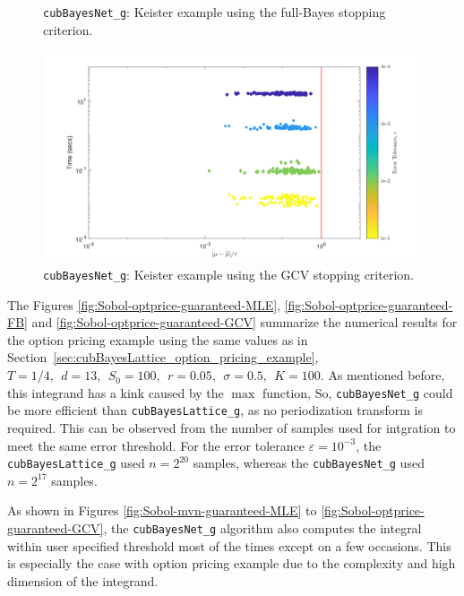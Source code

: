\documentclass{iitthesis}          %
\newcommand{\code}[1]{\texttt{#1}}
\newcommand\secref{Section~\ref}
\begin{document}
{{{{{{\begin{figure}
	\caption[Sobol: Keister guaranteed:Full Bayes]{\code{cubBayesNet\_g}: Keister example using the full-Bayes stopping criterion.}
	\label{fig:Sobol-keister-guaranteed-FB}
\end{figure}
\begin{figure}
	\centering
	\includegraphics[width=0.95\linewidth]{"Sobol_Keister_guaranteed_time_GCV__d4_r1_2019-Jun-9"}
	\caption[Sobol: Keister guaranteed:GCV]{\code{cubBayesNet\_g}: Keister example using the GCV stopping criterion.}
	\label{fig:Sobol-keister-guaranteed-GCV}
\end{figure}

The Figures \ref{fig:Sobol-optprice-guaranteed-MLE}, \ref{fig:Sobol-optprice-guaranteed-FB} and 
\ref{fig:Sobol-optprice-guaranteed-GCV} summarize the numerical results for the option pricing example using the same values as in \secref{sec:cubBayesLattice_option_pricing_example},
$
T = 1/4, \ \ d = 13, \ \ S_0 = 100, \ \ r =  0.05, \ \ \sigma = 0.5, \ \ K = 100.
$
As mentioned before, this integrand has a kink caused by the $\max$ function, So, \code{cubBayesNet\_g} could be more efficient than \code{cubBayesLattice\_g}, as no periodization transform is required. This can be observed from the number of samples used for intgration to meet the same error threshold. For the error tolerance $\varepsilon=10^{-3}$, the \code{cubBayesLattice\_g} used $n=2^{20}$ samples, whereas the \code{cubBayesNet\_g} used $n=2^{17}$ samples.



As shown in Figures \ref{fig:Sobol-mvn-guaranteed-MLE} to \ref{fig:Sobol-optprice-guaranteed-GCV}, the \code{cubBayesNet\_g} algorithm also computes the integral within user specified threshold most of the times except on a few occasions. This is especially the case with option pricing example due to the complexity and high dimension of the integrand. 


}}}}}}
\end{document}
